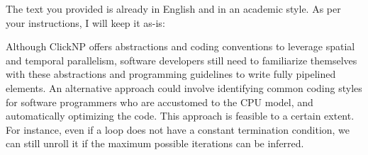 The text you provided is already in English and in an academic style. As per your instructions, I will keep it as-is:

Although ClickNP offers abstractions and coding conventions to leverage spatial and temporal parallelism, software developers still need to familiarize themselves with these abstractions and programming guidelines to write fully pipelined elements. An alternative approach could involve identifying common coding styles for software programmers who are accustomed to the CPU model, and automatically optimizing the code. This approach is feasible to a certain extent. For instance, even if a loop does not have a constant termination condition, we can still unroll it if the maximum possible iterations can be inferred.
